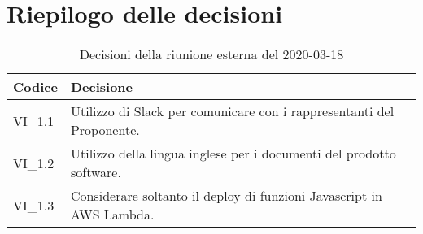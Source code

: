 \section{Riepilogo delle decisioni}
\begin{longtable}{
	 >{\centering}p{} >{}p{} }

	\caption{Decisioni della riunione esterna del 2020-03-18}\\

	\textbf{\color{white}Codice} &
	\textbf{\color{white}Decisione}
	\tabularnewline
	\endhead

	VI\_1.1 & Utilizzo di Slack per comunicare con i rappresentanti del Proponente. \\
	VI\_1.2 & Utilizzo della lingua inglese per i documenti del prodotto software. \\
	VI\_1.3 & Considerare soltanto il deploy di funzioni Javascript in AWS\ped{\emph{G}} Lambda. \\
\end{longtable}
